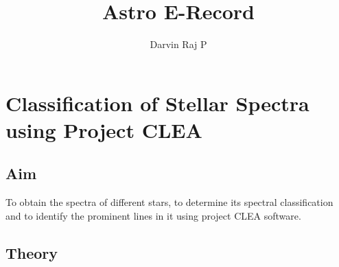\documentclass[letterpaper,11pt]{report}
\begin{document}
\title{Astro E-Record}
\author{Darvin Raj P}
\date{}
\maketitle
\tableofcontents

\chapter{Classification of Stellar Spectra using Project CLEA}

\section{Aim}

To obtain the spectra of different stars, to determine its spectral classification and to identify the prominent
lines in it using project CLEA software.

\section{Theory}
\end{document}

